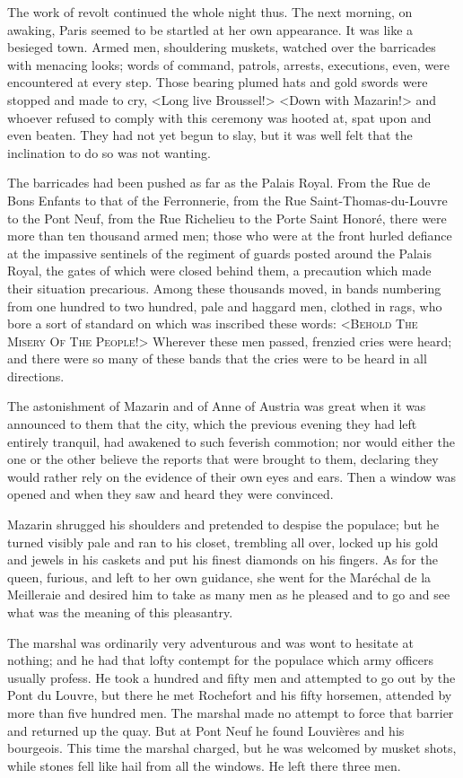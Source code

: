 The work of revolt continued the whole night thus. The next morning, on awaking, Paris seemed to be startled at her own appearance. It was like a besieged town. Armed men, shouldering muskets, watched over the barricades with menacing looks; words of command, patrols, arrests, executions, even, were encountered at every step. Those bearing plumed hats and gold swords were stopped and made to cry, <Long live Broussel!> <Down with Mazarin!> and whoever refused to comply with this ceremony was hooted at, spat upon and even beaten. They had not yet begun to slay, but it was well felt that the inclination to do so was not wanting.

The barricades had been pushed as far as the Palais Royal. From the Rue de Bons Enfants to that of the Ferronnerie, from the Rue Saint-Thomas-du-Louvre to the Pont Neuf, from the Rue Richelieu to the Porte Saint Honoré, there were more than ten thousand armed men; those who were at the front hurled defiance at the impassive sentinels of the regiment of guards posted around the Palais Royal, the gates of which were closed behind them, a precaution which made their situation precarious. Among these thousands moved, in bands numbering from one hundred to two hundred, pale and haggard men, clothed in rags, who bore a sort of standard on which was inscribed these words: <\textsc{Behold The Misery Of The People!}> Wherever these men passed, frenzied cries were heard; and there were so many of these bands that the cries were to be heard in all directions.

The astonishment of Mazarin and of Anne of Austria was great when it was announced to them that the city, which the previous evening they had left entirely tranquil, had awakened to such feverish commotion; nor would either the one or the other believe the reports that were brought to them, declaring they would rather rely on the evidence of their own eyes and ears. Then a window was opened and when they saw and heard they were convinced.

Mazarin shrugged his shoulders and pretended to despise the populace; but he turned visibly pale and ran to his closet, trembling all over, locked up his gold and jewels in his caskets and put his finest diamonds on his fingers. As for the queen, furious, and left to her own guidance, she went for the Maréchal de la Meilleraie and desired him to take as many men as he pleased and to go and see what was the meaning of this pleasantry.

The marshal was ordinarily very adventurous and was wont to hesitate at nothing; and he had that lofty contempt for the populace which army officers usually profess. He took a hundred and fifty men and attempted to go out by the Pont du Louvre, but there he met Rochefort and his fifty horsemen, attended by more than five hundred men. The marshal made no attempt to force that barrier and returned up the quay. But at Pont Neuf he found Louvières and his bourgeois. This time the marshal charged, but he was welcomed by musket shots, while stones fell like hail from all the windows. He left there three men.

